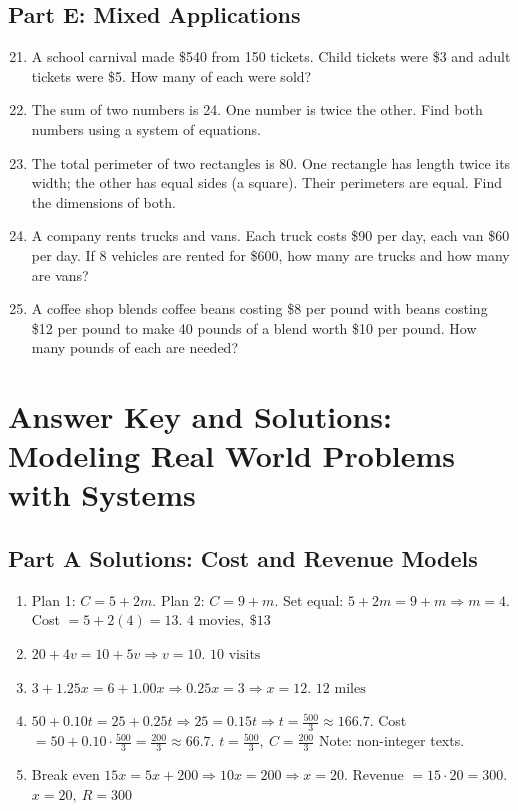 \documentclass[14pt]{extarticle}
\begin{document}
\subsection*{Part E: Mixed Applications}
\begin{enumerate}
  \setcounter{enumi}{20}
  \item A school carnival made \$540 from 150 tickets. Child tickets were \$3 and adult tickets were \$5. How many of each were sold?
  \item The sum of two numbers is 24. One number is twice the other. Find both numbers using a system of equations.
  \item The total perimeter of two rectangles is 80. One rectangle has length twice its width; the other has equal sides (a square). Their perimeters are equal. Find the dimensions of both.
  \item A company rents trucks and vans. Each truck costs \$90 per day, each van \$60 per day. If 8 vehicles are rented for \$600, how many are trucks and how many are vans?
  \item A coffee shop blends coffee beans costing \$8 per pound with beans costing \$12 per pound to make 40 pounds of a blend worth \$10 per pound. How many pounds of each are needed?
\end{enumerate}

\newpage


\section*{Answer Key and Solutions: Modeling Real World Problems with Systems}

\subsection*{Part A Solutions: Cost and Revenue Models}
\begin{enumerate}
  \item Plan 1: \(C=5+2m\). Plan 2: \(C=9+m\).  
  Set equal: \(5+2m=9+m \Rightarrow m=4\). Cost \(=5+2(4)=13\). \(\boxed{4\text{ movies},\ \$13}\)

  \item \(20+4v=10+5v \Rightarrow v=10\). \(\boxed{10\text{ visits}}\)

  \item \(3+1.25x=6+1.00x \Rightarrow 0.25x=3 \Rightarrow x=12\). \(\boxed{12\text{ miles}}\)

  \item \(50+0.10t=25+0.25t \Rightarrow 25=0.15t \Rightarrow t=\frac{500}{3}\approx166.7\).  
  Cost \(=50+0.10\cdot\frac{500}{3}=\frac{200}{3}\approx66.7\). \(\boxed{t=\frac{500}{3},\ C=\frac{200}{3}}\)  
  Note: non-integer texts.

  \item Break even \(15x=5x+200 \Rightarrow 10x=200 \Rightarrow x=20\). Revenue \(=15\cdot20=300\). \(\boxed{x=20,\ R=300}\)
\end{enumerate}
\end{document}
